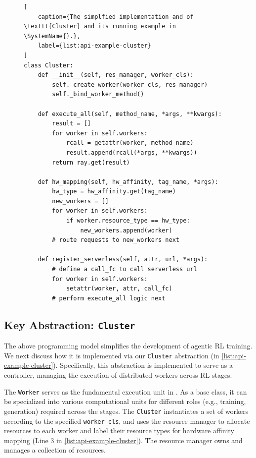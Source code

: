 \begin{figure}[t]
\centering
\begin{lstlisting}[
    caption={The simplfied implementation and of \texttt{Cluster} and its running example in \SystemName{}.},
    label={list:api-example-cluster}
]
class Cluster: 
    def __init__(self, res_manager, worker_cls): 
        self._create_worker(worker_cls, res_manager)
        self._bind_worker_method()
    
    def execute_all(self, method_name, *args, **kwargs):
        result = []
        for worker in self.workers: 
            rcall = getattr(worker, method_name)
            result.append(rcall(*args, **kwargs))
        return ray.get(result)

    def hw_mapping(self, hw_affinity, tag_name, *args):
        hw_type = hw_affinity.get(tag_name)
        new_workers = []
        for worker in self.workers:
            if worker.resource_type == hw_type: 
                new_workers.append(worker)
        # route requests to new_workers next

    def register_serverless(self, attr, url, *args): 
        # define a call_fc to call serverless url
        for worker in self.workers: 
            setattr(worker, attr, call_fc)
        # perform execute_all logic next
\end{lstlisting}
\end{figure}



\subsection{Key Abstraction: \texttt{Cluster}}
\label{sec:cluster}
The above programming model simplifies the development of agentic RL training.
We next discuss how it is implemented via our \texttt{Cluster} abstraction (in \autoref{list:api-example-cluster}). Specifically, this abstraction is implemented to serve as a controller, managing the execution of distributed workers across RL stages. 


The \texttt{Worker} serves as the fundamental execution unit in \SystemName{}. 
As a base class, it can be specialized into various computational units for different roles (e.g., training, generation) required across the stages.
The \texttt{Cluster} instantiates a set of workers according to the specified \texttt{worker\_cls}, and uses the resource manager to allocate resources to each worker and label their resource types for hardware affinity mapping (Line 3 in \autoref{list:api-example-cluster}). The resource manager owns and manages a collection of resources. 

